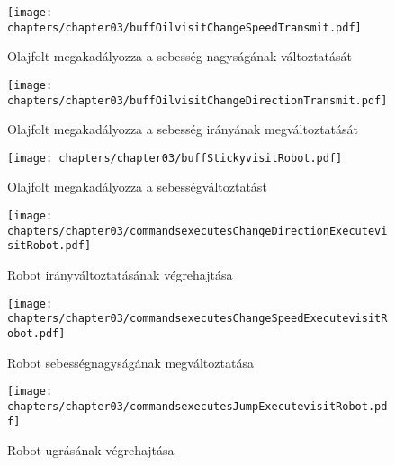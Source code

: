 \begin{figure}[h]
	\begin{center}
		\texttt{[image: chapters/chapter03/buffOilvisitChangeSpeedTransmit.pdf]}
		\caption{Olajfolt megakadályozza a sebesség nagyságának változtatását}
		\label{fig:buff.Oil.visit}
	\end{center}
\end{figure}

\begin{figure}[h]
	\begin{center}
		\texttt{[image: chapters/chapter03/buffOilvisitChangeDirectionTransmit.pdf]}
		\caption{Olajfolt megakadályozza a sebesség irányának megváltoztatását}
		\label{fig:buff.Oil.visit2}
	\end{center}
\end{figure}

\begin{figure}[h]
	\begin{center}
		\texttt{[image: chapters/chapter03/buffStickyvisitRobot.pdf]}
		\caption{Olajfolt megakadályozza a sebességváltoztatást}
		\label{fig:buff.Sticky.visit}
	\end{center}
\end{figure}

\begin{figure}[h]
	\begin{center}
		\texttt{[image: chapters/chapter03/commandsexecutesChangeDirectionExecutevisitRobot.pdf]}
		\caption{Robot irányváltoztatásának végrehajtása}
		\label{fig:command.executes.ChangeDirectionExecute.visit}
	\end{center}
\end{figure}

\begin{figure}[h]
	\begin{center}
		\texttt{[image: chapters/chapter03/commandsexecutesChangeSpeedExecutevisitRobot.pdf]}
		\caption{Robot sebességnagyságának megváltoztatása}
		\label{fig:command.executes.ChangeSpeedExecute.visit}
	\end{center}
\end{figure}

\begin{figure}[h]
	\begin{center}
		\texttt{[image: chapters/chapter03/commandsexecutesJumpExecutevisitRobot.pdf]}
		\caption{Robot ugrásának végrehajtása}
		\label{fig:command.executes.JumpExecute.visit}
	\end{center}
\end{figure}

